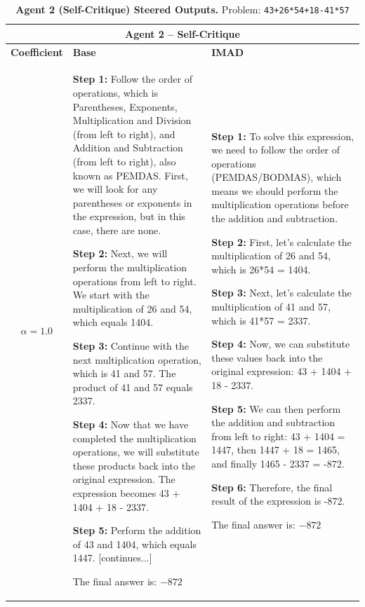 \begin{table}[t]
\centering
\caption{\textbf{Agent 2 (Self-Critique) Steered Outputs.} Problem: \texttt{43+26*54+18-41*57}}
\label{tab:agent2_examples}
\begin{tabularx}{\textwidth}{c|X|X}
\multicolumn{3}{c}{\textbf{Agent 2 -- Self-Critique}} \\
\hline
\textbf{Coefficient} & \textbf{Base} & \textbf{IMAD} \\
\hline
$\alpha = 1.0$ & 
\textbf{Step 1:} Follow the order of operations, which is Parentheses, Exponents, Multiplication and Division (from left to right), and Addition and Subtraction (from left to right), also known as PEMDAS. First, we will look for any parentheses or exponents in the expression, but in this case, there are none.

\textbf{Step 2:} Next, we will perform the multiplication operations from left to right. We start with the multiplication of 26 and 54, which equals 1404.

\textbf{Step 3:} Continue with the next multiplication operation, which is 41 and 57. The product of 41 and 57 equals 2337.

\textbf{Step 4:} Now that we have completed the multiplication operations, we will substitute these products back into the original expression. The expression becomes 43 + 1404 + 18 - 2337.

\textbf{Step 5:} Perform the addition of 43 and 1404, which equals 1447. [continues...]

The final answer is: $\boxed{-872}$
& 
\textbf{Step 1:} To solve this expression, we need to follow the order of operations (PEMDAS/BODMAS), which means we should perform the multiplication operations before the addition and subtraction.

\textbf{Step 2:} First, let's calculate the multiplication of 26 and 54, which is 26*54 = 1404.

\textbf{Step 3:} Next, let's calculate the multiplication of 41 and 57, which is 41*57 = 2337.

\textbf{Step 4:} Now, we can substitute these values back into the original expression: 43 + 1404 + 18 - 2337.

\textbf{Step 5:} We can then perform the addition and subtraction from left to right: 43 + 1404 = 1447, then 1447 + 18 = 1465, and finally 1465 - 2337 = -872.

\textbf{Step 6:} Therefore, the final result of the expression is -872.

The final answer is: $\boxed{-872}$


\end{tabularx}
\end{table}
